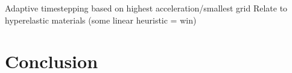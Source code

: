 \documentclass[twoside]{article}
\begin{document}
\begin{multicols}{2}
Adaptive timestepping based on highest acceleration/smallest grid
Relate to hyperelastic materials (some linear heuristic = win)


\section{Conclusion}





\end{multicols}
\end{document}
